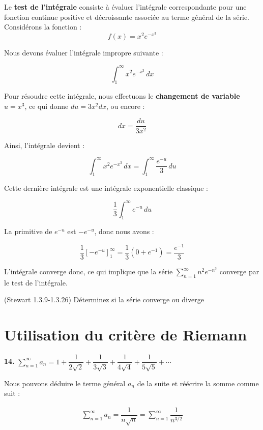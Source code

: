 \documentclass{report}
\begin{document}
    \noindent
    Le \textbf{test de l'intégrale} consiste à évaluer l'intégrale correspondante pour 
    une fonction continue positive et décroissante associée au terme général 
    de la série. Considérons la fonction :
    \[
    f(x) = x^2 e^{-x^3}
    \]

    Nous devons évaluer l'intégrale impropre suivante :

    \[
    \int_{1}^{\infty} x^2 e^{-x^3} \, dx
    \]

    Pour résoudre cette intégrale, nous effectuons le \textbf{changement de variable }   
    \( u = x^3 \), ce qui donne \( du = 3x^2 dx \), ou encore :

    \[
    dx = \frac{du}{3x^2}
    \]

    Ainsi, l'intégrale devient :

    \[
    \int_{1}^{\infty} x^2 e^{-x^3} \, dx = \int_{1}^{\infty} \frac{e^{-u}}{3} \, du
    \]

    Cette dernière intégrale est une intégrale exponentielle classique :

    \[
    \frac{1}{3} \int_{1}^{\infty} e^{-u} \, du
    \]

    La primitive de \( e^{-u} \) est \( -e^{-u} \), donc nous avons :

    \[
    \frac{1}{3} \left[ -e^{-u} \right]_{1}^{\infty} 
    = \frac{1}{3} \left( 0 + e^{-1} \right) = \frac{e^{-1}}{3}
    \]

    L'intégrale converge donc, ce qui implique que la série \(\sum_{n=1}^{\infty} n^2 e^{-n^3}\) 
    converge par le test de l'intégrale. 


    \begin{Exercice}{(Stewart 1.3.9-1.3.26)}{}
        Déterminez si la série converge ou diverge
    \end{Exercice}

    \vspace{1em}
    \section{Utilisation du critère de Riemann}
    \noindent
    \textbf{14.} $\sum_{n=1}^{\infty }a_n = 
    1 + \dfrac{1}{2\sqrt{2}} + \dfrac{1}{3\sqrt{3}} + \dfrac{1}{4\sqrt{4}} + \dfrac{1}{5\sqrt{5}} + \cdots$ 

    \vspace{1em}
    Nous pouvons déduire le terme général $a_n$ de la suite et réécrire la somme comme suit :

    \begin{align*}
        \sum_{n=1}^{\infty }a_n = \dfrac{1}{n\sqrt{n}} = \sum_{n=1}^{\infty }\dfrac{1}{n^{3/2}} 
    \end{align*}
\end{document}

